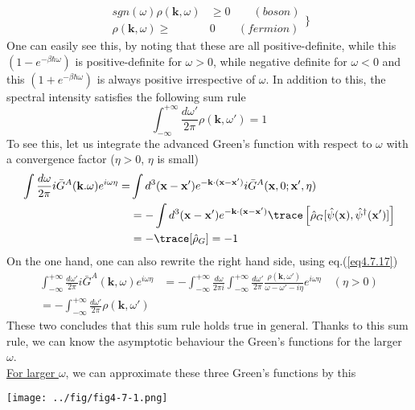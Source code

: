 \begin{equation}
\begin{aligned}
sgn(\omega) \rho(\mathbf{k},\omega) &\ge 0 \qquad (boson)\\
\rho(\mathbf{k},\omega)\ge &0 \qquad (fermion)
\end{aligned}
\Big\}
\end{equation}
 One can easily see this, by noting that these are all positive-definite, while this $(1-e^{-\beta\hbar\omega})$ is positive-definite for $\omega>0$, while negative definite for $\omega<0$ and this $(1+e^{-\beta\hbar\omega})$ is always positive irrespective of $\omega$.
 In addition to this, the spectral intensity satisfies the following sum rule
\begin{equation}
\int_{-\infty}^{+\infty} \frac{d\omega'}{2\pi} \rho(\mathbf{k},\omega')=1
\end{equation}
 To see this, let us integrate the advanced Green's function with respect to $\omega$ with a convergence factor ($\eta>0$, $\eta$ is small)
\[
\begin{aligned}
\int \frac{d\omega}{2\pi} i\bar G ^A(\mathbf{k}.\omega) e^{i\omega\eta}=&\int d^3 (\mathbf{x}-\mathbf{x}') e^{-\mathbf{k}\cdot (\mathbf{x}-\mathbf{x}')} i\bar G^A(\mathbf{x},0;\mathbf{x}',\eta)\\
&=-\int d^3 (\mathbf{x}-\mathbf{x}') e^{-\mathbf{k}\cdot (\mathbf{x}-\mathbf{x}')} \trace \left[ \hat \rho_G [\hat \psi (\mathbf x),\hat \psi ^\dag (\mathbf x')] \right]\\
&=-\trace [\hat \rho _G]=-1
\end{aligned}
\]
On the one hand, one can also rewrite the right hand side, using eq.(\ref{eq4.7.17})
\[
\begin{aligned}
\int_{-\infty}^{+\infty} \frac{d\omega'}{2\pi} i\bar G^A(\mathbf{k},\omega) e^{i\omega\eta}&=-\int_{-\infty}^{+\infty} \frac{d\omega}{2\pi i} \int_{-\infty}^{+\infty} \frac{d\omega'}{2\pi} \frac{\rho(\mathbf{k},\omega')}{\omega-\omega'-i\eta} e^{i\omega\eta} \quad (\eta>0)\\
=-\int_{-\infty}^{+\infty} \frac{d\omega'}{2\pi} \rho(\mathbf{k},\omega')
\end{aligned}
\]
 These two concludes that this sum rule holds true in general.
 Thanks to this sum rule, we can know the asymptotic behaviour the Green's functions for the larger $\omega$.\\
\uline{For larger $\omega$}, we can approximate these three Green's functions by this 
\begin{center}
\texttt{[image: ../fig/fig4-7-1.png]}
\end{center}
